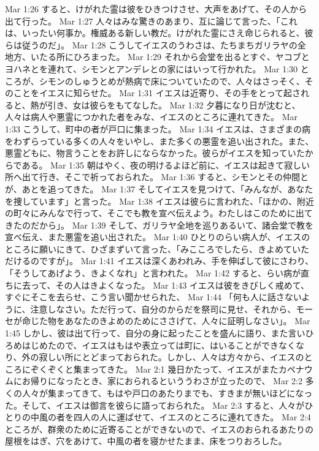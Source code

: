Mar 1:26  すると、けがれた霊は彼をひきつけさせ、大声をあげて、その人から出て行った。
Mar 1:27  人々はみな驚きのあまり、互に論じて言った、「これは、いったい何事か。権威ある新しい教だ。けがれた霊にさえ命じられると、彼らは従うのだ」。
Mar 1:28  こうしてイエスのうわさは、たちまちガリラヤの全地方、いたる所にひろまった。
Mar 1:29  それから会堂を出るとすぐ、ヤコブとヨハネとを連れて、シモンとアンデレとの家にはいって行かれた。
Mar 1:30  ところが、シモンのしゅうとめが熱病で床についていたので、人々はさっそく、そのことをイエスに知らせた。
Mar 1:31  イエスは近寄り、その手をとって起されると、熱が引き、女は彼らをもてなした。
Mar 1:32  夕暮になり日が沈むと、人々は病人や悪霊につかれた者をみな、イエスのところに連れてきた。
Mar 1:33  こうして、町中の者が戸口に集まった。
Mar 1:34  イエスは、さまざまの病をわずらっている多くの人々をいやし、また多くの悪霊を追い出された。また、悪霊どもに、物言うことをお許しにならなかった。彼らがイエスを知っていたからである。
Mar 1:35  朝はやく、夜の明けるよほど前に、イエスは起きて寂しい所へ出て行き、そこで祈っておられた。
Mar 1:36  すると、シモンとその仲間とが、あとを追ってきた。
Mar 1:37  そしてイエスを見つけて、「みんなが、あなたを捜しています」と言った。
Mar 1:38  イエスは彼らに言われた、「ほかの、附近の町々にみんなで行って、そこでも教を宣べ伝えよう。わたしはこのために出てきたのだから」。
Mar 1:39  そして、ガリラヤ全地を巡りあるいて、諸会堂で教を宣べ伝え、また悪霊を追い出された。
Mar 1:40  ひとりのらい病人が、イエスのところに願いにきて、ひざまずいて言った、「みこころでしたら、きよめていただけるのですが」。
Mar 1:41  イエスは深くあわれみ、手を伸ばして彼にさわり、「そうしてあげよう、きよくなれ」と言われた。
Mar 1:42  すると、らい病が直ちに去って、その人はきよくなった。
Mar 1:43  イエスは彼をきびしく戒めて、すぐにそこを去らせ、こう言い聞かせられた、
Mar 1:44  「何も人に話さないように、注意しなさい。ただ行って、自分のからだを祭司に見せ、それから、モーセが命じた物をあなたのきよめのためにささげて、人々に証明しなさい」。
Mar 1:45  しかし、彼は出て行って、自分の身に起ったことを盛んに語り、また言いひろめはじめたので、イエスはもはや表立っては町に、はいることができなくなり、外の寂しい所にとどまっておられた。しかし、人々は方々から、イエスのところにぞくぞくと集まってきた。
Mar 2:1  幾日かたって、イエスがまたカペナウムにお帰りになったとき、家におられるといううわさが立ったので、
Mar 2:2  多くの人々が集まってきて、もはや戸口のあたりまでも、すきまが無いほどになった。そして、イエスは御言を彼らに語っておられた。
Mar 2:3  すると、人々がひとりの中風の者を四人の人に運ばせて、イエスのところに連れてきた。
Mar 2:4  ところが、群衆のために近寄ることができないので、イエスのおられるあたりの屋根をはぎ、穴をあけて、中風の者を寝かせたまま、床をつりおろした。
